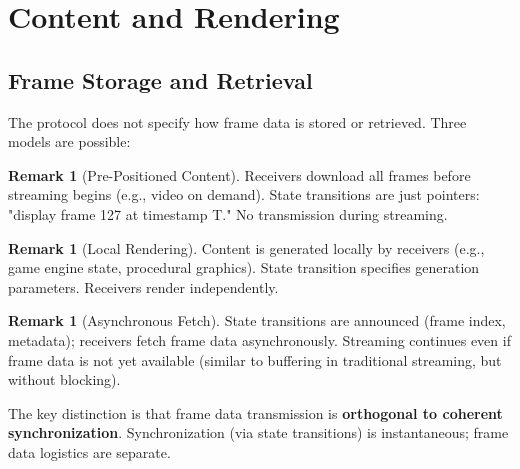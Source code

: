 \documentclass[twocolumn,10pt,a4paper]{article}
\theoremstyle{plain}
\theoremstyle{definition}
\newtheorem{remark}[theorem]{Remark}
\begin{document}
\section{Content and Rendering}
\label{sec:content}

\subsection{Frame Storage and Retrieval}

The protocol does not specify how frame data is stored or retrieved. Three models are possible:

\begin{remark}[Pre-Positioned Content]
Receivers download all frames before streaming begins (e.g., video on demand). State transitions are just pointers: "display frame 127 at timestamp T." No transmission during streaming.
\end{remark}

\begin{remark}[Local Rendering]
Content is generated locally by receivers (e.g., game engine state, procedural graphics). State transition specifies generation parameters. Receivers render independently.
\end{remark}

\begin{remark}[Asynchronous Fetch]
State transitions are announced (frame index, metadata); receivers fetch frame data asynchronously. Streaming continues even if frame data is not yet available (similar to buffering in traditional streaming, but without blocking).
\end{remark}

The key distinction is that frame data transmission is \textbf{orthogonal to coherent synchronization}. Synchronization (via state transitions) is instantaneous; frame data logistics are separate.
\end{document}
